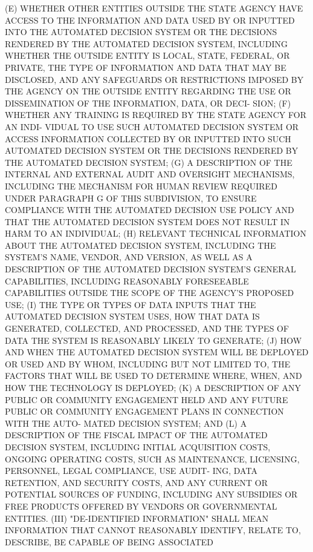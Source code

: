    (E) WHETHER OTHER ENTITIES OUTSIDE THE STATE AGENCY HAVE ACCESS TO THE
 INFORMATION  AND  DATA  USED  BY OR INPUTTED INTO THE AUTOMATED DECISION
 SYSTEM OR THE DECISIONS  RENDERED  BY  THE  AUTOMATED  DECISION  SYSTEM,
 INCLUDING  WHETHER  THE  OUTSIDE  ENTITY  IS  LOCAL,  STATE, FEDERAL, OR
 PRIVATE, THE TYPE OF INFORMATION AND DATA THAT MAY BE DISCLOSED, AND ANY
 SAFEGUARDS  OR  RESTRICTIONS IMPOSED BY THE AGENCY ON THE OUTSIDE ENTITY
 REGARDING THE USE OR DISSEMINATION OF THE INFORMATION,  DATA,  OR  DECI-
 SION;
   (F)  WHETHER ANY TRAINING IS REQUIRED BY THE STATE AGENCY FOR AN INDI-
 VIDUAL TO USE SUCH  AUTOMATED  DECISION  SYSTEM  OR  ACCESS  INFORMATION
 COLLECTED  BY  OR  INPUTTED  INTO  SUCH AUTOMATED DECISION SYSTEM OR THE
 DECISIONS RENDERED BY THE AUTOMATED DECISION SYSTEM;
   (G) A DESCRIPTION OF THE INTERNAL AND  EXTERNAL  AUDIT  AND  OVERSIGHT
 MECHANISMS,  INCLUDING  THE  MECHANISM  FOR  HUMAN REVIEW REQUIRED UNDER
 PARAGRAPH G OF THIS SUBDIVISION, TO ENSURE COMPLIANCE WITH THE AUTOMATED
 DECISION USE POLICY AND THAT THE  AUTOMATED  DECISION  SYSTEM  DOES  NOT
 RESULT IN HARM TO AN INDIVIDUAL;
   (H)  RELEVANT  TECHNICAL  INFORMATION  ABOUT  THE  AUTOMATED  DECISION
 SYSTEM, INCLUDING THE SYSTEM'S NAME, VENDOR, AND VERSION, AS WELL  AS  A
 DESCRIPTION  OF  THE  AUTOMATED  DECISION SYSTEM'S GENERAL CAPABILITIES,
 INCLUDING REASONABLY FORESEEABLE CAPABILITIES OUTSIDE THE SCOPE  OF  THE
 AGENCY'S PROPOSED USE;
   (I)  THE  TYPE  OR  TYPES  OF  DATA INPUTS THAT THE AUTOMATED DECISION
 SYSTEM USES, HOW THAT DATA IS GENERATED, COLLECTED, AND  PROCESSED,  AND
 THE TYPES OF DATA THE SYSTEM IS REASONABLY LIKELY TO GENERATE;
   (J)  HOW  AND  WHEN  THE AUTOMATED DECISION SYSTEM WILL BE DEPLOYED OR
 USED AND BY WHOM, INCLUDING BUT NOT LIMITED TO, THE FACTORS THAT WILL BE
 USED TO DETERMINE WHERE, WHEN, AND HOW THE TECHNOLOGY IS DEPLOYED;
   (K) A DESCRIPTION OF ANY PUBLIC OR COMMUNITY ENGAGEMENT HELD  AND  ANY
 FUTURE PUBLIC OR COMMUNITY ENGAGEMENT PLANS IN CONNECTION WITH THE AUTO-
 MATED DECISION SYSTEM; AND
   (L)  A  DESCRIPTION  OF  THE  FISCAL  IMPACT OF THE AUTOMATED DECISION
 SYSTEM, INCLUDING INITIAL ACQUISITION COSTS,  ONGOING  OPERATING  COSTS,
 SUCH  AS MAINTENANCE, LICENSING, PERSONNEL, LEGAL COMPLIANCE, USE AUDIT-
 ING, DATA RETENTION, AND SECURITY COSTS, AND ANY  CURRENT  OR  POTENTIAL
 SOURCES  OF FUNDING, INCLUDING ANY SUBSIDIES OR FREE PRODUCTS OFFERED BY
 VENDORS OR GOVERNMENTAL ENTITIES.
   (III) "DE-IDENTIFIED INFORMATION" SHALL MEAN INFORMATION  THAT  CANNOT
 REASONABLY IDENTIFY, RELATE TO, DESCRIBE, BE CAPABLE OF BEING ASSOCIATED
